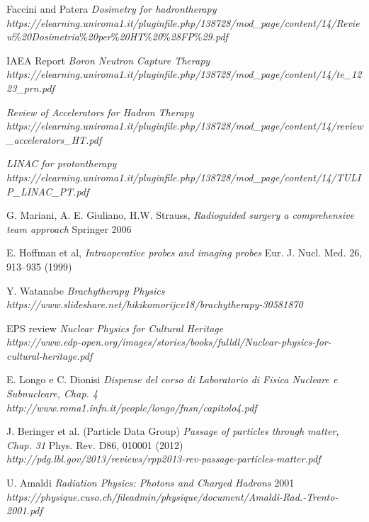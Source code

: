 \documentclass [a4paper, twoside] {book}
\begin{document}
\begin{thebibliography}{35}
Faccini and Patera
\textit{Dosimetry for hadrontherapy}
\\ \textit{https://elearning.uniroma1.it/pluginfile.php/138728/mod\_page/content/14/Review$\%$20Dosimetria$\%$20per$\%$20HT$\%$20$\%$28FP$\%$29.pdf}

IAEA Report
\textit{Boron Neutron Capture Therapy}
\\ \textit{https://elearning.uniroma1.it/pluginfile.php/138728/mod\_page/content/14/te\_1223\_prn.pdf}

\textit{Review of Accelerators for Hadron Therapy}
\\ \textit{https://elearning.uniroma1.it/pluginfile.php/138728/mod\_page/content/14/review\_accelerators\_HT.pdf}

\textit{LINAC for protontherapy}
\\ \textit{https://elearning.uniroma1.it/pluginfile.php/138728/mod\_page/content/14/TULIP\_LINAC\_PT.pdf}

G. Mariani, A. E. Giuliano, H.W. Strauss,
\textit{Radioguided surgery a comprehensive team approach}
Springer 2006

E. Hoffman et al,
\textit{Intraoperative probes and imaging probes}
Eur. J. Nucl. Med. 26, 913–935 (1999)

Y. Watanabe
\textit{Brachytherapy Physics}
\\ \textit{https://www.slideshare.net/hikikomorijcv18/brachytherapy-30581870}

EPS review
\textit{Nuclear Physics for Cultural Heritage}
\\ \textit{https://www.edp-open.org/images/stories/books/fulldl/Nuclear-physics-for-cultural-heritage.pdf}

E. Longo e C. Dionisi
\textit{Dispense del corso di Laboratorio di Fisica Nucleare e Subnucleare, Chap. 4}
\\ \textit{http://www.roma1.infn.it/people/longo/fnsn/capitolo4.pdf}

J. Beringer et al. (Particle Data Group)
\textit{Passage of particles through matter, Chap. 31}
Phys. Rev. D86, 010001 (2012)
\\ \textit{http://pdg.lbl.gov/2013/reviews/rpp2013-rev-passage-particles-matter.pdf}

U. Amaldi
\textit{Radiation Physics: Photons and Charged Hadrons}
2001 \\ \textit{https://physique.cuso.ch/fileadmin/physique/document/Amaldi-Rad.-Trento-2001.pdf}


\end{thebibliography}
\end{document}
